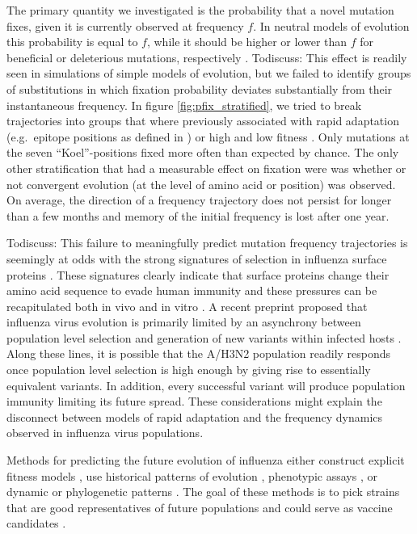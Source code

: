 \documentclass[reprint,amsmath,amssymb,superscriptaddress,showpacs,pre]{revtex4-1}
\newcommand{\discuss}[1]{{\color{green}Todiscuss: #1}}
\begin{document}
The primary quantity we investigated is the probability that a novel mutation fixes, given it is currently observed at frequency $f$.
In neutral models of evolution this probability is equal to $f$, while it should be higher or lower than $f$ for beneficial or deleterious mutations, respectively \citep{kimura_diffusion_1964}.
\discuss{This effect is readily seen in simulations of simple models of evolution, but we failed to identify groups of substitutions in which fixation probability deviates substantially from their instantaneous frequency.} 
In figure \ref{fig:pfix_stratified}, we tried to break trajectories into groups that where previously associated with rapid adaptation (e.g.~epitope positions as defined in \citep{Shih6283,Koel976,bush_predicting_1999,luksza_predictive_2014}) or high and low fitness \citep{neher_predicting_2014}. 
Only mutations at the seven ``Koel''-positions fixed more often than expected by chance.
The only other stratification that had a measurable effect on fixation were was whether or not convergent evolution (at the level of amino acid or position) was observed. 
On average, the direction of a frequency trajectory does not persist for longer than a few months and memory of the initial frequency is lost after one year. 


\discuss{This failure to meaningfully predict mutation frequency trajectories} is seemingly at odds with the strong signatures of selection in influenza surface proteins \citep{bhatt_genomic_2011,strelkowa_clonal_2012}.
These signatures clearly indicate that surface proteins change their amino acid sequence to evade human immunity and these pressures can be recapitulated both in vivo and in vitro \citep{lee_mapping_2019,xue_within-host_nodate}.
A recent preprint proposed that influenza virus evolution is primarily limited by an asynchrony between population level selection and generation of new variants within infected hosts \citep{morris_asynchrony_2020}. 
Along these lines, it is possible that the A/H3N2 population readily responds once population level selection is high enough by giving rise to essentially equivalent variants.
In addition, every successful variant will produce population immunity limiting its future spread. 
These considerations might explain the disconnect between models of rapid adaptation and the frequency dynamics observed in influenza virus populations.

Methods for predicting the future evolution of influenza either construct explicit fitness models \citep{luksza_predictive_2014}, use historical patterns of evolution \citep{luksza_predictive_2014,bush_predicting_1999}, phenotypic assays \citep{neher_prediction_2016,steinbruck_inference_2012}, or dynamic or phylogenetic patterns \citep{neher_predicting_2014,klingen_sweep_2018}. 
The goal of these methods is to pick strains that are good representatives of future populations and could serve as vaccine candidates \citep{morris2018predictive}.
\end{document}
